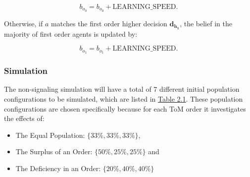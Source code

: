\[
b_{o_0} = b_{o_0} + \text{{LEARNING\_SPEED}}.
\]

Otherwise, if $a$ matches the first order higher decision $\mathbf{d_{h_1}}$, the belief in the majority of first order agents is updated by:

\[
    b_{o_1} = b_{o_1} + \text{{LEARNING\_SPEED}}.
\]

\subsubsection{Simulation}

The non-signaling simulation will have a total of 7 different initial population configurations to be simulated, which are listed in \hyperref[tab:reg-population-table]{Table 2.1}. These population configurations are chosen specifically because for each ToM order it investigates the effects of:
\begin{itemize}
    \item The Equal Population: $\{33\%,33\%,33\%\}$,
    \item The Surplus of an Order: $\{50\%,25\%,25\%\}$ and 
    \item The Deficiency in an Order: $\{20\%,40\%,40\%\}$
\end{itemize}

